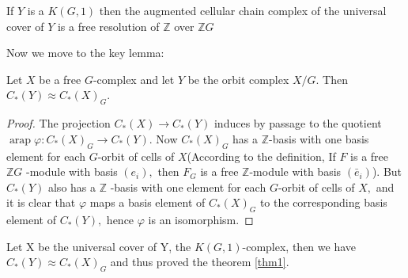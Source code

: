 \begin{proposition}
If $Y$ is a $K(G, 1)$ then the augmented cellular chain complex of the universal cover of $Y$ is a free resolution of $\mathbb{Z}$ over $\mathbb{Z} G$
\end{proposition}
Now we move to the key lemma:
\begin{lemma}
Let $X$ be a free $G$-complex and let $Y$ be the orbit complex
$X / G .$ Then $C_{*}(Y) \approx C_{*}(X)_{G}$.
\end{lemma}
\begin{proof}
The projection $C_{*}(X) \rightarrow C_{*}(Y)$ induces by passage to the quotient $\operatorname{arap} \varphi: C_{*}(X)_{G} \rightarrow C_{*}(Y) .$ Now $C_{*}(X)_{G}$ has a $\mathbb{Z}$-basis with one basis element for each $G$-orbit of cells of $X$(According to the definition, If $F$ is a free $\mathbb{Z} G$ -module with basis $\left(e_{i}\right),$ then $F_{G}$ is a free $\mathbb{Z}$-module with basis $\left(\bar{e}_{i}\right)$). But $C_{*}(Y)$ also has a $\mathbb{Z}$ -basis with one element for each $G$-orbit of cells of $X,$ and it is clear that $\varphi$ maps a basis element of $C_{*}(X)_{G}$ to the corresponding basis element of $C_{*}(Y),$ hence $\varphi$ is an isomorphism.
\end{proof}
Let X be the universal cover of Y, the $K(G,1)$-complex, then we have $C_{*}(Y) \approx C_{*}(X)_{G}$ and thus proved the theorem \ref{thm1}.
